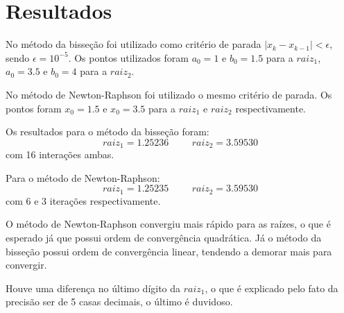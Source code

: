 \documentclass[12pt, a4paper]{report}
\begin{document}
\section{Resultados}
No método da bisseção foi utilizado como critério de parada $|x_k - x_{k-1}| < \epsilon$, sendo $\epsilon = 10^{-5}$.
Os pontos utilizados foram $a_0 = 1$ e $b_0 = 1.5$ para a $raiz_1$, $a_0 = 3.5$ e $b_0 = 4$ para a $raiz_2$.

No método de Newton-Raphson foi utilizado o mesmo critério de parada. Os pontos foram $x_0 = 1.5$ e $x_0 = 3.5$ para a $raiz_1$ e $raiz_2$ respectivamente.

Os resultados para o método da bisseção foram:
\begin{displaymath}
    raiz_1 = 1.25236 \hspace{1cm} raiz_2 = 3.59530
\end{displaymath}
com 16 interações ambas.

Para o método de Newton-Raphson:
\begin{displaymath}
    raiz_1 = 1.25235 \hspace{1cm} raiz_2 = 3.59530
\end{displaymath}
com 6 e 3 iterações respectivamente.

O método de Newton-Raphson convergiu mais rápido para as raízes, o que é esperado já que possui ordem de convergência quadrática. Já o método da bisseção possui ordem de convergência linear, tendendo a demorar mais para convergir.

Houve uma diferença no último dígito da $raiz_1$, o que é explicado pelo fato da precisão ser de 5 casas decimais, o último é duvidoso.
\end{document}
